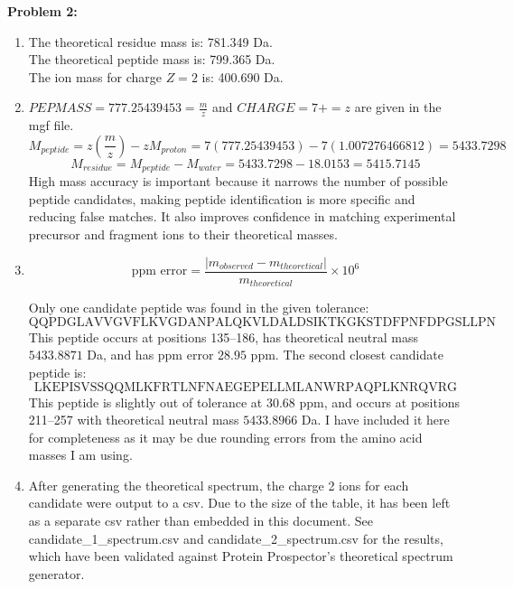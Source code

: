 \documentclass{article}
\begin{document}
\pagebreak

\textbf{Problem 2:}
\begin{enumerate}[label=(\alph*)]
    \item The theoretical residue mass is: 781.349 Da. \\
    The theoretical peptide mass is: 799.365 Da. \\
    The ion mass for charge $Z = 2$ is: 400.690 Da.
    \item $PEPMASS = 777.25439453 = \frac{m}{z}$ and $CHARGE=7+ = z$ are given in the mgf file.
    $$M_{peptide} = z\left(\frac{m}{z}\right) - zM_{proton} = 7(777.25439453) - 7(1.007276466812) = 5433.7298$$
    $$M_{residue} = M_{peptide} - M_{water} = 5433.7298 - 18.0153 = 5415.7145$$
    High mass accuracy is important because it narrows the number of possible peptide candidates, making peptide identification is more specific and reducing false matches.
    It also improves confidence in matching experimental precursor and fragment ions to their theoretical masses.
    \item $$\text{ppm error} = \frac{|m_{observed} - m_{theoretical}|}{m_{theoretical}}\times 10^6$$

    Only one candidate peptide was found in the given tolerance: $$\text{QQPDGLAVVGVFLKVGDANPALQKVLDALDSIKTKGKSTDFPNFDPGSLLPN}$$
    This peptide occurs at positions 135--186, has theoretical neutral mass $5433.8871$ Da, and has ppm error $28.95$ ppm.
    The second closest candidate peptide is: $$\text{LKEPISVSSQQMLKFRTLNFNAEGEPELLMLANWRPAQPLKNRQVRG}$$
    This peptide is slightly out of tolerance at 30.68 ppm, and occurs at positions 211--257 with theoretical neutral mass $5433.8966$ Da. I have included it here for completeness as it may be due rounding errors from the amino acid masses I am using.

    \item After generating the theoretical spectrum, the charge 2 ions for each candidate were output to a csv. 
    Due to the size of the table, it has been left as a separate csv rather than embedded in this document. 
        See candidate\_1\_spectrum.csv and candidate\_2\_spectrum.csv for the results, which have been validated against Protein Prospector's theoretical spectrum generator.


\end{enumerate}
\end{document}
